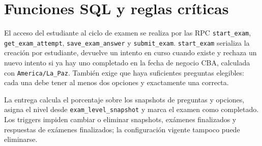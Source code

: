 \section{Funciones SQL y reglas críticas}

El acceso del estudiante al ciclo de examen se realiza por las RPC \texttt{start\_exam}, \texttt{get\_exam\_attempt}, \texttt{save\_exam\_answer} y \texttt{submit\_exam}. \texttt{start\_exam} serializa la creación por estudiante, devuelve un intento en curso cuando existe y rechaza un nuevo intento si ya hay uno completado en la fecha de negocio CBA, calculada con \texttt{America/La\_Paz}. También exige que haya suficientes preguntas elegibles: cada una debe tener al menos dos opciones y exactamente una correcta.

La entrega calcula el porcentaje sobre los snapshots de preguntas y opciones, asigna el nivel desde \texttt{exam\_level\_snapshot} y marca el examen como completado. Los triggers impiden cambiar o eliminar snapshots, exámenes finalizados y respuestas de exámenes finalizados; la configuración vigente tampoco puede eliminarse.
